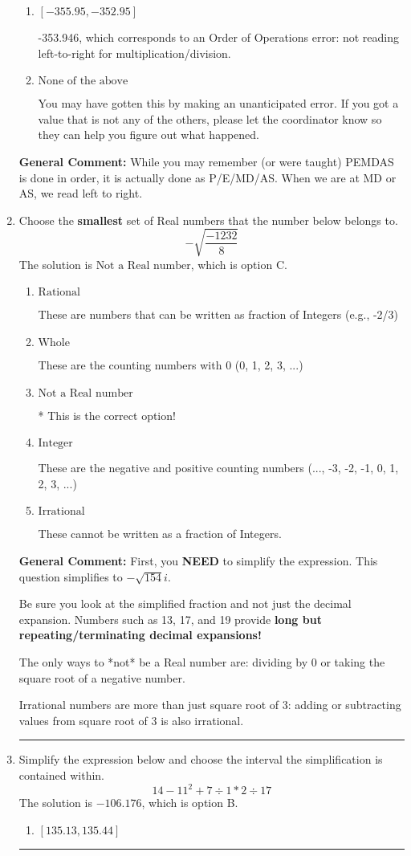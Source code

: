 \documentclass{extbook}[14pt]
\newcommand{\litem}[1]{\item #1

\rule{\textwidth}{0.4pt}}
\begin{document}
\begin{enumerate}
{\begin{enumerate}[label=\Alph*.]
* -343.500, this is the correct option
\item \( [-355.95, -352.95] \)

 -353.946, which corresponds to an Order of Operations error: not reading left-to-right for multiplication/division.
\item \( \text{None of the above} \)

 You may have gotten this by making an unanticipated error. If you got a value that is not any of the others, please let the coordinator know so they can help you figure out what happened.
\end{enumerate}

\textbf{General Comment:} While you may remember (or were taught) PEMDAS is done in order, it is actually done as P/E/MD/AS. When we are at MD or AS, we read left to right.
}
\litem{
Choose the \textbf{smallest} set of Real numbers that the number below belongs to.
\[ -\sqrt{\frac{-1232}{8}} \]
The solution is \( \text{Not a Real number} \), which is option C.\begin{enumerate}[label=\Alph*.]
\item \( \text{Rational} \)

These are numbers that can be written as fraction of Integers (e.g., -2/3)
\item \( \text{Whole} \)

These are the counting numbers with 0 (0, 1, 2, 3, ...)
\item \( \text{Not a Real number} \)

* This is the correct option!
\item \( \text{Integer} \)

These are the negative and positive counting numbers (..., -3, -2, -1, 0, 1, 2, 3, ...)
\item \( \text{Irrational} \)

These cannot be written as a fraction of Integers.
\end{enumerate}

\textbf{General Comment:} First, you \textbf{NEED} to simplify the expression. This question simplifies to $-\sqrt{154} i$. 
 
 Be sure you look at the simplified fraction and not just the decimal expansion. Numbers such as 13, 17, and 19 provide \textbf{long but repeating/terminating decimal expansions!} 
 
 The only ways to *not* be a Real number are: dividing by 0 or taking the square root of a negative number. 
 
 Irrational numbers are more than just square root of 3: adding or subtracting values from square root of 3 is also irrational.
}
\litem{
Simplify the expression below and choose the interval the simplification is contained within.
\[ 14 - 11^2 + 7 \div 1 * 2 \div 17 \]
The solution is \( -106.176 \), which is option B.\begin{enumerate}[label=\Alph*.]
\item \( [135.13, 135.44] \)


\end{enumerate}}
\end{enumerate}
\end{document}
